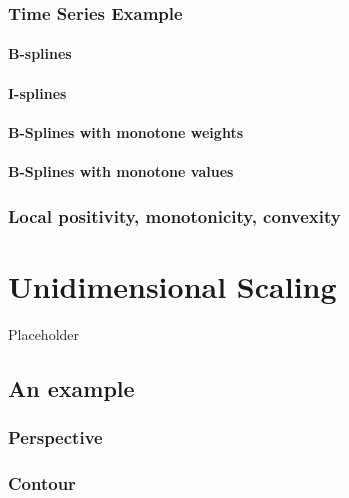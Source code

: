 \documentclass[
  12pt,
]{book}
\begin{document}
\subsection{Time Series Example}\label{time-series-example}

\subsubsection{B-splines}\label{b-splines}

\subsubsection{I-splines}\label{i-splines}

\subsubsection{B-Splines with monotone weights}\label{b-splines-with-monotone-weights}

\subsubsection{B-Splines with monotone values}\label{b-splines-with-monotone-values}

\subsection{Local positivity, monotonicity, convexity}\label{local-positivity-monotonicity-convexity}

\chapter{Unidimensional Scaling}\label{unidimensional}

Placeholder

\section{An example}\label{an-example-1}

\subsection{Perspective}\label{perspective}

\subsection{Contour}\label{contour}
\end{document}
